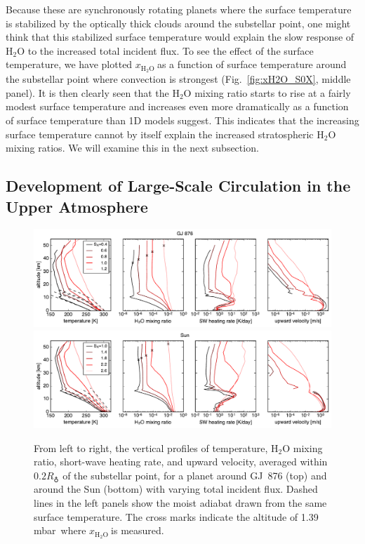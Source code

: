\documentclass[11pt,numberedappendix,twocolappendix,]{emulateapj}
\def\water{H$_2$O }
\def\xwater{\dsa{$x_\text{\water}$}}
\def\preslevel{1.39 mbar\ }
\newcommand{\dsa}[1]{{\color{blue}#1}}
\begin{document}
Because these are synchronously rotating planets where the surface temperature is stabilized by the optically thick clouds around the \dsa{substellar} \dsa{point}, one might think that this stabilized surface temperature would explain the slow  response of \water to the increased total incident flux. 
To see the effect of the surface temperature, we \dsa{have plotted} \xwater as a function of surface temperature around the \dsa{substellar} \dsa{point} where \dsa{convection is strongest} (Fig.~\ref{fig:xH2O_S0X}, middle panel). 
It is then clearly seen that the \water mixing ratio starts to rise at a fairly modest surface temperature and increases even more dramatically as a function of surface temperature than 1D models suggest. 
This \dsa{indicates that} the increasing surface temperature \dsa{cannot by itself} explain the increased stratospheric \water mixing ratios. 
We will examine this in the next subsection. 

\subsection{Development of Large-Scale Circulation in the Upper Atmosphere}
\label{ss:result_omega}


\begin{figure}[htb]
    \begin{center}
    \includegraphics[width=1\hsize]{fig/AqOH0TLS_GJ876_temp_xH2O_vz_heat.pdf}
    \includegraphics[width=1\hsize]{fig/AqOH0TLS_Sun_temp_xH2O_vz_heat.pdf}
    \end{center}
\caption{From left to right, the vertical profiles of temperature, \water mixing ratio, short-wave heating rate, and upward velocity, averaged \dsa{within} $0.2R_\earth$ of the substellar point, for a planet around GJ~876 (top) and around the Sun (bottom) with varying total incident flux. Dashed lines in the left panels show the moist adiabat drawn from the same surface temperature. The cross marks indicate the altitude \dsa{of} \preslevel where \xwater is measured. }
\label{fig:AqOH0TLS_GJ876_temp_xH2O_vz_heat}
\end{figure}
\end{document}
